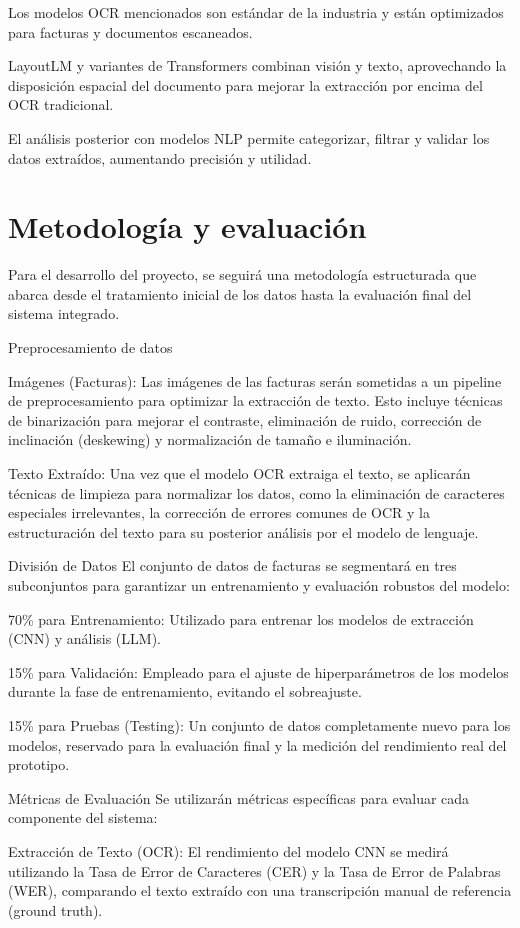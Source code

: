 \documentclass[11pt,letterpaper]{article}
\begin{document}
Los modelos OCR mencionados son estándar de la industria y están optimizados para facturas y documentos escaneados.

LayoutLM y variantes de Transformers combinan visión y texto, aprovechando la disposición espacial del documento para mejorar la extracción por encima del OCR tradicional.

El análisis posterior con modelos NLP permite categorizar, filtrar y validar los datos extraídos, aumentando precisión y utilidad.

\section{Metodología y evaluación}
Para el desarrollo del proyecto, se seguirá una metodología estructurada que abarca desde el tratamiento inicial de los datos hasta la evaluación final del sistema integrado.

Preprocesamiento de datos

Imágenes (Facturas): Las imágenes de las facturas serán sometidas a un pipeline de preprocesamiento para optimizar la extracción de texto. Esto incluye técnicas de binarización para mejorar el contraste, eliminación de ruido, corrección de inclinación (deskewing) y normalización de tamaño e iluminación.

Texto Extraído: Una vez que el modelo OCR extraiga el texto, se aplicarán técnicas de limpieza para normalizar los datos, como la eliminación de caracteres especiales irrelevantes, la corrección de errores comunes de OCR y la estructuración del texto para su posterior análisis por el modelo de lenguaje.

División de Datos El conjunto de datos de facturas se segmentará en tres subconjuntos para garantizar un entrenamiento y evaluación robustos del modelo:

70\% para Entrenamiento: Utilizado para entrenar los modelos de extracción (CNN) y análisis (LLM).

15\% para Validación: Empleado para el ajuste de hiperparámetros de los modelos durante la fase de entrenamiento, evitando el sobreajuste.

15\% para Pruebas (Testing): Un conjunto de datos completamente nuevo para los modelos, reservado para la evaluación final y la medición del rendimiento real del prototipo.

Métricas de Evaluación Se utilizarán métricas específicas para evaluar cada componente del sistema:

Extracción de Texto (OCR): El rendimiento del modelo CNN se medirá utilizando la Tasa de Error de Caracteres (CER) y la Tasa de Error de Palabras (WER), comparando el texto extraído con una transcripción manual de referencia (ground truth).
\end{document}
